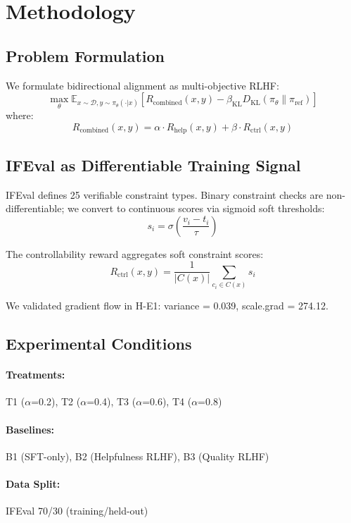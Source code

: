 \section{Methodology}
\label{sec:methodology}

\subsection{Problem Formulation}

We formulate bidirectional alignment as multi-objective RLHF:
\begin{equation}
\max_\theta \mathbb{E}_{x \sim \mathcal{D}, y \sim \pi_\theta(\cdot|x)} \left[ R_{\text{combined}}(x, y) - \beta_{\text{KL}} D_{\text{KL}}(\pi_\theta \| \pi_{\text{ref}}) \right]
\end{equation}
where:
\begin{equation}
R_{\text{combined}}(x, y) = \alpha \cdot R_{\text{help}}(x, y) + \beta \cdot R_{\text{ctrl}}(x, y)
\end{equation}

\subsection{IFEval as Differentiable Training Signal}

IFEval defines 25 verifiable constraint types. Binary constraint checks are non-differentiable; we convert to continuous scores via sigmoid soft thresholds:
\begin{equation}
s_i = \sigma\left(\frac{v_i - t_i}{\tau}\right)
\end{equation}

The controllability reward aggregates soft constraint scores:
\begin{equation}
R_{\text{ctrl}}(x, y) = \frac{1}{|C(x)|} \sum_{c_i \in C(x)} s_i
\end{equation}

We validated gradient flow in H-E1: variance = 0.039, scale.grad = 274.12.

\subsection{Experimental Conditions}

\paragraph{Treatments:} T1 ($\alpha$=0.2), T2 ($\alpha$=0.4), T3 ($\alpha$=0.6), T4 ($\alpha$=0.8)

\paragraph{Baselines:} B1 (SFT-only), B2 (Helpfulness RLHF), B3 (Quality RLHF)

\paragraph{Data Split:} IFEval 70/30 (training/held-out)
